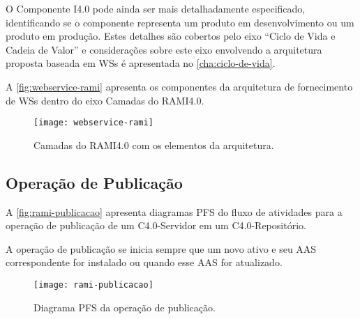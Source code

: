 O Componente I4.0 pode ainda ser mais detalhadamente especificado, identificando se o componente representa um produto em desenvolvimento ou um produto em produção. Estes detalhes são cobertos pelo eixo ``Ciclo de Vida e Cadeia de Valor'' e considerações sobre este eixo envolvendo a arquitetura proposta baseada em WSs é apresentada no \autoref{cha:ciclo-de-vida}.

A \autoref{fig:webservice-rami} apresenta os componentes da arquitetura de fornecimento de WSs dentro do eixo Camadas do RAMI4.0.%


\begin{figure}[H]
	\centering
	\texttt{[image: webservice-rami]}
	\caption{Camadas do RAMI4.0 com os elementos da arquitetura.}
	\label{fig:webservice-rami}
\end{figure}

\subsection{Operação de Publicação}

A \autoref{fig:rami-publicacao} apresenta diagramas PFS do fluxo de atividades para a operação de publicação de um C4.0-Servidor em um C4.0-Repositório.

A operação de publicação se inicia sempre que um novo ativo e seu AAS correspondente for instalado ou quando esse AAS for atualizado.

\begin{figure}[htb]
	\centering
	\texttt{[image: rami-publicacao]}
	\caption{Diagrama PFS da operação de publicação.}
	\label{fig:rami-publicacao}
\end{figure}

